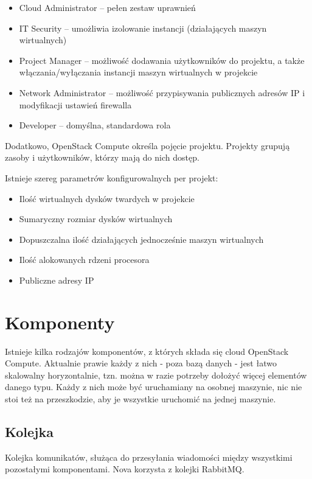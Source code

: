 \begin{itemize}
\item Cloud Administrator -- pełen zestaw uprawnień
\item IT Security -- umożliwia izolowanie instancji (działających maszyn wirtualnych)
\item Project Manager -- możliwość dodawania użytkowników do projektu, a także włączania/wyłączania instancji maszyn wirtualnych w projekcie
\item Network Administrator -- możliwość przypisywania publicznych adresów IP i modyfikacji ustawień firewalla
\item Developer -- domyślna, standardowa rola
\end{itemize}

Dodatkowo, OpenStack Compute określa pojęcie projektu. Projekty grupują zasoby i użytkowników, którzy mają do nich dostęp.

Istnieje szereg parametrów konfigurowalnych per projekt\cite{nova_manual}:

\begin{itemize}
\item Ilość wirtualnych dysków twardych w projekcie
\item Sumaryczny rozmiar dysków wirtualnych
\item Dopuszczalna ilość działających jednocześnie maszyn wirtualnych
\item Ilość alokowanych rdzeni procesora
\item Publiczne adresy IP
\end{itemize}

\section{Komponenty}

Istnieje kilka rodzajów komponentów, z których składa się cloud OpenStack Compute\cite{nova_manual}.
Aktualnie prawie każdy z nich - poza bazą danych - jest łatwo skalowalny horyzontalnie, tzn. można w razie potrzeby dołożyć więcej elementów danego typu. Każdy z nich może być uruchamiany na osobnej maszynie, nic nie stoi też na przeszkodzie, aby je wszystkie uruchomić na jednej maszynie.

\subsection{Kolejka}
Kolejka komunikatów, służąca do przesyłania wiadomości między wszystkimi pozostałymi komponentami. Nova korzysta z kolejki RabbitMQ.

